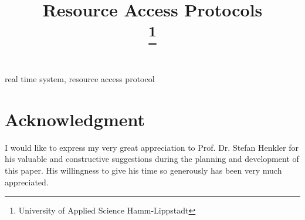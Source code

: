 \documentclass[conference]{IEEEtran}
\begin{document}
\title{Resource Access Protocols\\
{\footnotesize }
\thanks{University of Applied Science Hamm-Lippstadt}
}

\author{

}

\maketitle


\begin{IEEEkeywords}
real time system, resource access protocol 
\end{IEEEkeywords}














\section*{Acknowledgment}

I would like to express my very great appreciation to Prof. Dr. Stefan Henkler  for his valuable and constructive suggestions during the planning and development of this paper. His willingness to give his time so generously has been very much appreciated.



 
\end{document}
